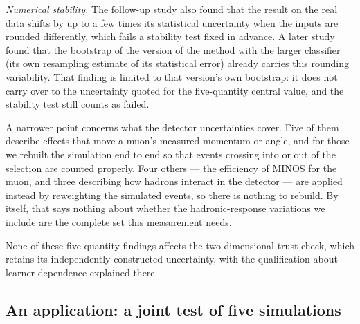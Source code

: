 \emph{Numerical stability.} The follow-up study also found that the result on the real data shifts by up to a few times its statistical uncertainty when the inputs are rounded differently, which fails a stability test fixed in advance. A later study found that the bootstrap of the version of the method with the larger classifier (its own resampling estimate of its statistical error) already carries this rounding variability. That finding is limited to that version's own bootstrap: it does not carry over to the uncertainty quoted for the five-quantity central value, and the stability test still counts as failed.

A narrower point concerns what the detector uncertainties cover. Five of them describe effects that move a muon's measured momentum or angle, and for those we rebuilt the simulation end to end so that events crossing into or out of the selection are counted properly. Four others --- the efficiency of MINOS for the muon, and three describing how hadrons interact in the detector --- are applied instead by reweighting the simulated events, so there is nothing to rebuild. By itself, that says nothing about whether the hadronic-response variations we include are the complete set this measurement needs.

None of these five-quantity findings affects the two-dimensional trust check, which retains its independently constructed uncertainty, with the qualification about learner dependence explained there.

\subsection*{An application: a joint test of five simulations}

